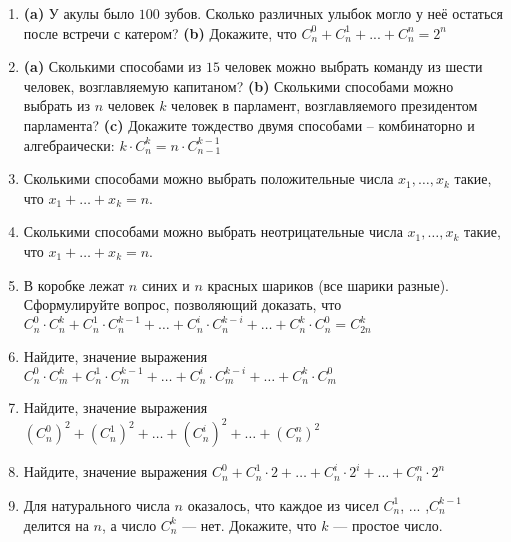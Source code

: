\documentclass{article}
\begin{document}
\begin{enumerate}[label*=\protect\fbox{\arabic{enumi}}]
\item \textbf{(a)} У акулы было $100$ зубов. Сколько различных улыбок могло у неё остаться после встречи
с катером? \textbf{(b)} Докажите, что $C^0_n + C^1_n + ... + C^n_n = 2^n$

\item \textbf{(a)} Сколькими способами из $15$ человек можно выбрать команду из шести человек, возглавляемую капитаном? \textbf{(b)} Сколькими способами можно выбрать из $n$ человек $k$ человек в парламент, возглавляемого президентом парламента? \textbf{(c)} Докажите тождество двумя способами – комбинаторно и алгебраически: $k \cdot C^k_n = n \cdot C^{k-1}_{n-1}$

\item Сколькими способами можно выбрать положительные числа $x_1, \dotso , x_k$ такие, что $x_1 + \dotso + x_k = n$.

\item Сколькими способами можно выбрать неотрицательные числа $x_1, \dotso , x_k$ такие, что $x_1 + \dotso + x_k = n$.

\item В коробке лежат $n$ синих и $n$ красных шариков (все шарики разные). Сформулируйте
вопрос, позволяющий доказать, что $C^0_n \cdot C^k_n +C^1_n \cdot C^{k-1}_n+\dotso+C^i_n \cdot C^{k-i}_n +\dotso + C^k_n \cdot C^0_n =C^k_{2n}$

\item Найдите, значение выражения $C^0_n \cdot C^k_m +C^1_n \cdot C^{k-1}_m+\dotso+C^i_n \cdot C^{k-i}_m +\dotso + C^k_n \cdot C^0_m$

\item Найдите, значение выражения $(C^0_n)^2 +(C^1_n)^2 +\dotso+(C^i_n)^2 +\dotso + (C^n_n)^2$

\item Найдите, значение выражения $C^0_n +C^1_n \cdot 2 +\dotso+C^i_n \cdot 2^i +\dotso + C^n_n \cdot 2^n$

\item Для натурального числа $n$ оказалось, что каждое из чисел $C^1_n$, ... ,$C^{k - 1}_n$
делится на $n$, а число $C^k_n$ — нет. Докажите, что $k$ — простое число.

\end{enumerate}
\end{document}
